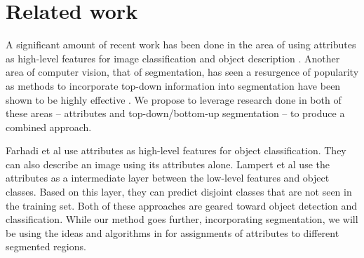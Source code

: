 \documentclass[10pt,twocolumn,letterpaper]{article}
\begin{document}
\section{Related work}
A significant amount of recent work has been done in the area of using
attributes as high-level features for image classification and object
description \cite{farhadi09, lampert09, kumar09}.  
Another area of computer vision, that of segmentation,
has seen a resurgence of popularity as methods to incorporate top-down
information into segmentation have been shown to be highly effective
\cite{borenstein04, pantofaru, gu09, russell06, malisiewicz, leibe04, hoiem05, shotton06}.  
We propose to leverage research done in both of these areas -- attributes
and top-down/bottom-up segmentation -- to produce a combined approach.

Farhadi et al
\cite{farhadi09} use attributes as high-level features for object classification. They
can also describe an image using its attributes alone.
Lampert et al \cite{lampert09}
use the attributes as a intermediate layer between the low-level
features and object classes. Based on this layer, they can predict
disjoint classes that are not seen in the training set.  Both of these
approaches are geared toward object detection and classification.  While
our method goes further, incorporating segmentation, we will be using
the ideas and algorithms in \cite{farhadi09} for assignments of 
attributes to different segmented regions.
\end{document}
